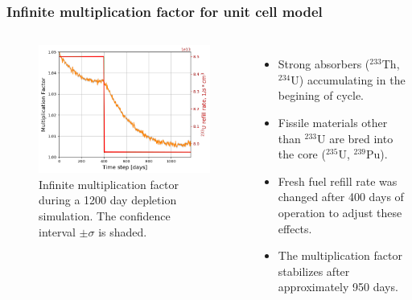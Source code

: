 \begin{frame}
  \frametitle{Infinite multiplication factor for unit cell model}
    \begin{columns}
    \column[t]{7cm}
   \vspace{-0.35in}
  \begin{figure}[t]
   \hspace*{-0.2in}
   \includegraphics[height=0.75\textheight]{./images/keff.png}
   \vspace{-0.05in}
   \caption{Infinite multiplication factor during a 1200 day depletion simulation. The confidence interval $\pm\sigma$ is shaded.}
    \end{figure}

    \column[t]{4.5cm}
       \begin{itemize}
        \item Strong absorbers ($^{233}$Th,$^{234}$U) accumulating in the begining of cycle. 
   		\item Fissile materials other than $^{233}$U are bred into the core ($^{235}$U, $^{239}$Pu).
   		\item Fresh fuel refill rate was changed after 400 days of operation to adjust these effects.
   		\item The multiplication factor stabilizes after approximately 950 days.
       \end{itemize}
     \end{columns}
\end{frame}

